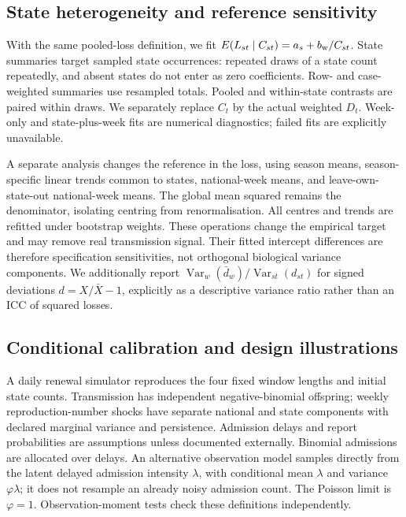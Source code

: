 \subsection{State heterogeneity and reference sensitivity}
\label{sec:meth-fe}

With the same pooled-loss definition, we fit $E(L_{st}\mid C_{st})=a_s+b_{\rm w}/C_{st}$. State summaries target sampled state occurrences: repeated draws of a state count repeatedly, and absent states do not enter as zero coefficients. Row- and case-weighted summaries use resampled totals. Pooled and within-state contrasts are paired within draws. We separately replace $C_t$ by the actual weighted $D_t$. Week-only and state-plus-week fits are numerical diagnostics; failed fits are explicitly unavailable.

A separate analysis changes the reference in the loss, using season means, season-specific linear trends common to states, national-week means, and leave-own-state-out national-week means. The global mean squared remains the denominator, isolating centring from renormalisation. All centres and trends are refitted under bootstrap weights. These operations change the empirical target and may remove real transmission signal. Their fitted intercept differences are therefore specification sensitivities, not orthogonal biological variance components. We additionally report $\operatorname{Var}_w(\bar d_w)/\operatorname{Var}_{st}(d_{st})$ for signed deviations $d=X/\bar X-1$, explicitly as a descriptive variance ratio rather than an ICC of squared losses.

\subsection{Conditional calibration and design illustrations}
\label{sec:meth-inversion}

A daily renewal simulator reproduces the four fixed window lengths and initial state counts. Transmission has independent negative-binomial offspring; weekly reproduction-number shocks have separate national and state components with declared marginal variance and persistence. Admission delays and report probabilities are assumptions unless documented externally. Binomial admissions are allocated over delays. An alternative observation model samples directly from the latent delayed admission intensity $\lambda$, with conditional mean $\lambda$ and variance $\varphi\lambda$; it does not resample an already noisy admission count. The Poisson limit is $\varphi=1$. Observation-moment tests check these definitions independently.

